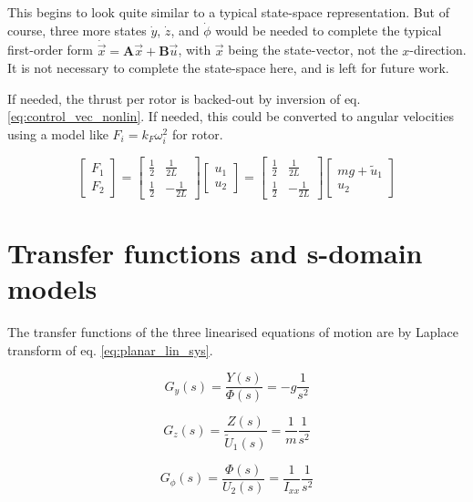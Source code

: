\documentclass[a4paper]{report}
\newcommand{\matr}[1]{\mathbf{#1}}
\begin{document}
This begins to look quite similar to a typical state-space representation.
But of course, three more states $\dot{y}$, $\dot{z}$, and $\dot{\phi}$ would be needed to complete the typical first-order form $\dot{\vec{x}} = \matr{A}\vec{x}+\matr{B}\vec{u}$, with $\vec{x}$ being the state-vector, not the $x$-direction.
It is not necessary to complete the state-space here, and is left for future work.

If needed, the thrust per rotor is backed-out by inversion of eq. \ref{eq:control_vec_nonlin}. 
If needed, this could be converted to angular velocities using a model like $F_i = k_F \omega_i ^2$ for rotor.

\begin{equation}
\begin{bmatrix}
F_1 \\
F_2
\end{bmatrix} 
= 
\begin{bmatrix}
\frac{1}{2} & \frac{1}{2L} \\
\frac{1}{2} & -\frac{1}{2L}
\end{bmatrix}
\begin{bmatrix}
u_1 \\
u_2
\end{bmatrix}
=
\begin{bmatrix}
\frac{1}{2} & \frac{1}{2L} \\
\frac{1}{2} & -\frac{1}{2L}
\end{bmatrix}
\begin{bmatrix}
mg+\tilde{u}_1 \\
u_2
\end{bmatrix}
\end{equation}


\section{Transfer functions and s-domain models}

The transfer functions of the three linearised equations of motion are by Laplace transform of eq. \ref{eq:planar_lin_sys}. 

\begin{equation}
G_y(s) = \frac{Y(s)}{\Phi(s)} = -g\frac{1}{s^2}
\end{equation}

\begin{equation}
G_z(s) = \frac{Z(s)}{\tilde{U}_1(s)} = \frac{1}{m} \frac{1}{s^2}
\end{equation}

\begin{equation}
G_{\phi}(s) = \frac{\Phi(s)}{U_2(s)} = \frac{1}{I_{xx}} \frac{1}{s^2}
\end{equation}
\end{document}
